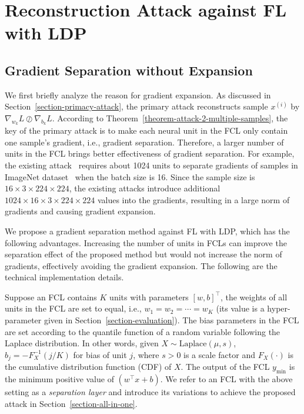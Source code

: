 \documentclass[lettersize,journal]{IEEEtran}
\begin{document}
\section{Reconstruction Attack against FL with LDP}
\label{section-attack}
\subsection{Gradient Separation without Expansion}
\label{section-removing-redundate-gradients}

We first briefly analyze the reason for gradient expansion. As discussed in Section~\ref{section-primacy-attack}, the primary attack reconstructs sample $x^{(i)}$ by $\nabla_{w_k} L \oslash \nabla_{b_k} L$. According to Theorem~\ref{theorem-attack-2-multiple-samples}, the key of the primary attack is to make each neural unit in the FCL only contain one sample's gradient, i.e., gradient separation. Therefore, a larger number of units in the FCL brings better effectiveness of gradient separation. For example, the existing attack~\cite{fowl2022robbing} requires about 1024 units to separate gradients of samples in ImageNet dataset~\cite{ILSVRC15} when the batch size is 16. Since the sample size is $16 \times 3 \times 224 \times 224$, the existing attacks introduce additional $1024 \times 16 \times 3 \times 224 \times 224$ values into the gradients, resulting in a large norm of gradients and causing gradient expansion.

We propose a gradient separation method against FL with LDP, which has the following advantages. Increasing the number of units in FCLs can improve the separation effect of the proposed method but would not increase the norm of gradients, effectively avoiding the gradient expansion. The following are the technical implementation details.

Suppose an FCL contains $K$ units with parameters  $\left[w,b\right]^\intercal$, the weights of all units in the FCL are set to equal, i.e., $w_1 = w_2 = \cdots = w_K$ (its value is a hyper-parameter given in Section~\ref{section-evaluation}). The bias parameters in the FCL are set according to the quantile function of a random variable following the Laplace distribution. In other words, given $X \sim \textrm{Laplace}(\mu,s)$, $b_j = - F^{-1}_X( j / K)$ for bias of unit $j$, where $s > 0$ is a scale factor and $F_X(\cdot)$ is the cumulative distribution function (CDF) of $X$. The output of the FCL $y_{\textrm{min}}$ is the minimum positive value of $\left( w^\intercal x + b\right)$. We refer to an FCL with the above setting as a \textit{separation layer} and introduce its variations to achieve the proposed attack in Section~\ref{section-all-in-one}.
\end{document}
